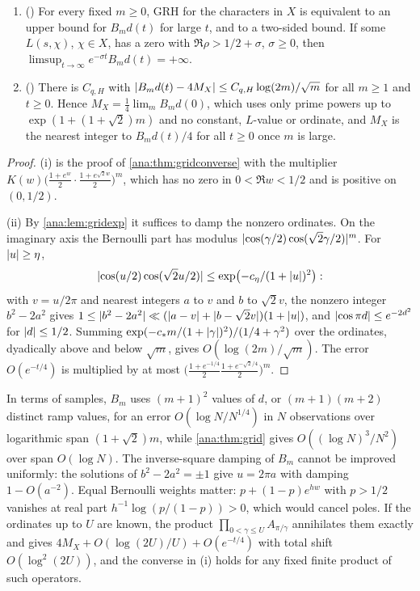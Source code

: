 \begin{theorem}\label{ana:thm:binomial}
\leavevmode
\begin{enumerate}[label=\textup{(\roman*)}]
\item \textup{(\stU)} For every fixed $m\ge0$, GRH for the characters in $X$ is equivalent to
 an upper bound for $B_md(t)$ for large $t$, and to a two-sided bound. If some $L(s,\chi)$,
 $\chi\in X$, has a zero with $\Re\rho>1/2+\sigma$, $\sigma\ge0$, then
 $\limsup_{t\to\infty}e^{-\sigma t}B_md(t)=+\infty$.
\item \textup{(\stG)} There is $C_{q,H}$ with $\lvert B_md(t)-4M_X\rvert\le C_{q,H}\log(2m)/\sqrt m$
 for all $m\ge1$ and $t\ge0$. Hence $M_X=\frac14\lim_mB_md(0)$, which uses only prime powers
 up to $\exp(1+(1+\sqrt2)m)$ and no constant, $L$-value or ordinate, and $M_X$ is the nearest
 integer to $B_md(t)/4$ for all $t\ge0$ once $m$ is large.
\end{enumerate}
\end{theorem}

\begin{proof}
(i) is the proof of \cref{ana:thm:gridconverse} with the multiplier
$K(w)\bigl(\frac{1+e^w}2\cdot\frac{1+e^{\sqrt2w}}2\bigr)^m$, which has no zero in
$0<\Re w<1/2$ and is positive on $(0,1/2)$.

(ii) By \cref{ana:lem:gridexp} it suffices to damp the nonzero ordinates. On the imaginary axis
the Bernoulli part has modulus $\lvert\cos(\gamma/2)\cos(\sqrt2\gamma/2)\rvert^m$. For $\lvert u\rvert\ge\eta$,
\[
 \lvert\cos(u/2)\cos(\sqrt2u/2)\rvert\le\exp\bigl(-c_\eta/(1+\lvert u\rvert)^2\bigr):
\]
with $v=u/2\pi$ and nearest integers $a$ to $v$ and $b$ to $\sqrt2v$, the nonzero integer
$b^2-2a^2$ gives $1\le\lvert b^2-2a^2\rvert\ll(\lvert a-v\rvert+\lvert b-\sqrt2v\rvert)(1+\lvert u\rvert)$, and
$\lvert\cos\pi d\rvert\le e^{-2d^2}$ for $\lvert d\rvert\le1/2$. Summing
$\exp(-c_*m/(1+\lvert\gamma\rvert)^2)/(1/4+\gamma^2)$ over the ordinates, dyadically above and below
$\sqrt m$, gives $O(\log(2m)/\sqrt m)$. The error $O(e^{-t/4})$ is multiplied by at most
$\bigl(\frac{1+e^{-1/4}}2\frac{1+e^{-\sqrt2/4}}2\bigr)^m$.
\end{proof}

In terms of samples, $B_m$ uses $(m+1)^2$ values of $d$, or $(m+1)(m+2)$ distinct ramp values,
for an error $O(\log N/N^{1/4})$ in $N$ observations over logarithmic span $(1+\sqrt2)m$, while
\cref{ana:thm:grid} gives $O((\log N)^3/N^2)$ over span $O(\log N)$. The inverse-square damping
of $B_m$ cannot be improved uniformly: the solutions of $b^2-2a^2=\pm1$ give $u=2\pi a$ with
damping $1-O(a^{-2})$. Equal Bernoulli weights matter: $p+(1-p)e^{hw}$ with $p>1/2$ vanishes at
real part $h^{-1}\log(p/(1-p))>0$, which would cancel poles. If the ordinates up to $U$ are known,
the product $\prod_{0<\gamma\le U}A_{\pi/\gamma}$ annihilates them exactly and gives
$4M_X+O(\log(2U)/U)+O(e^{-t/4})$ with total shift $O(\log^2(2U))$, and the converse in (i) holds
for any fixed finite product of such operators.

